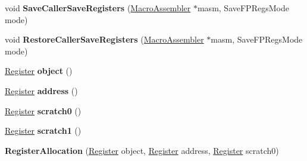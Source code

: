 \begin{DoxyCompactItemize}
\item 
void {\bfseries Save\+Caller\+Save\+Registers} (\hyperlink{classv8_1_1internal_1_1_macro_assembler}{Macro\+Assembler} $\ast$masm, Save\+F\+P\+Regs\+Mode mode)\hypertarget{classv8_1_1internal_1_1_record_write_stub_1_1_register_allocation_a676d8a1bb19a5746cfc613e7374253e0}{}\label{classv8_1_1internal_1_1_record_write_stub_1_1_register_allocation_a676d8a1bb19a5746cfc613e7374253e0}

\item 
void {\bfseries Restore\+Caller\+Save\+Registers} (\hyperlink{classv8_1_1internal_1_1_macro_assembler}{Macro\+Assembler} $\ast$masm, Save\+F\+P\+Regs\+Mode mode)\hypertarget{classv8_1_1internal_1_1_record_write_stub_1_1_register_allocation_ab0958eb63ba22b285852dcc0cc87c285}{}\label{classv8_1_1internal_1_1_record_write_stub_1_1_register_allocation_ab0958eb63ba22b285852dcc0cc87c285}

\item 
\hyperlink{structv8_1_1internal_1_1_register}{Register} {\bfseries object} ()\hypertarget{classv8_1_1internal_1_1_record_write_stub_1_1_register_allocation_ae02efad51bfcbf6207b6bd04c1331e06}{}\label{classv8_1_1internal_1_1_record_write_stub_1_1_register_allocation_ae02efad51bfcbf6207b6bd04c1331e06}

\item 
\hyperlink{structv8_1_1internal_1_1_register}{Register} {\bfseries address} ()\hypertarget{classv8_1_1internal_1_1_record_write_stub_1_1_register_allocation_a7b0d92fe5d7ba3d4339a055369bc1750}{}\label{classv8_1_1internal_1_1_record_write_stub_1_1_register_allocation_a7b0d92fe5d7ba3d4339a055369bc1750}

\item 
\hyperlink{structv8_1_1internal_1_1_register}{Register} {\bfseries scratch0} ()\hypertarget{classv8_1_1internal_1_1_record_write_stub_1_1_register_allocation_ae60e0fd70f8010f33818c9a5a30d0057}{}\label{classv8_1_1internal_1_1_record_write_stub_1_1_register_allocation_ae60e0fd70f8010f33818c9a5a30d0057}

\item 
\hyperlink{structv8_1_1internal_1_1_register}{Register} {\bfseries scratch1} ()\hypertarget{classv8_1_1internal_1_1_record_write_stub_1_1_register_allocation_a5834c8a35762e9a5346835d345b69bd2}{}\label{classv8_1_1internal_1_1_record_write_stub_1_1_register_allocation_a5834c8a35762e9a5346835d345b69bd2}

\item 
{\bfseries Register\+Allocation} (\hyperlink{structv8_1_1internal_1_1_register}{Register} object, \hyperlink{structv8_1_1internal_1_1_register}{Register} address, \hyperlink{structv8_1_1internal_1_1_register}{Register} scratch0)\hypertarget{classv8_1_1internal_1_1_record_write_stub_1_1_register_allocation_a9bd2c5bd869faf743a61ac1a0e89a8b3}{}\label{classv8_1_1internal_1_1_record_write_stub_1_1_register_allocation_a9bd2c5bd869faf743a61ac1a0e89a8b3}


\end{DoxyCompactItemize}
